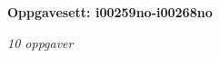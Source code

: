 \centerline{\bf Oppgavesett: i00259no-i00268no}
\vskip 10pt
\centerline{\it 10 oppgaver}\vskip 10pt
\vskip 10pt
